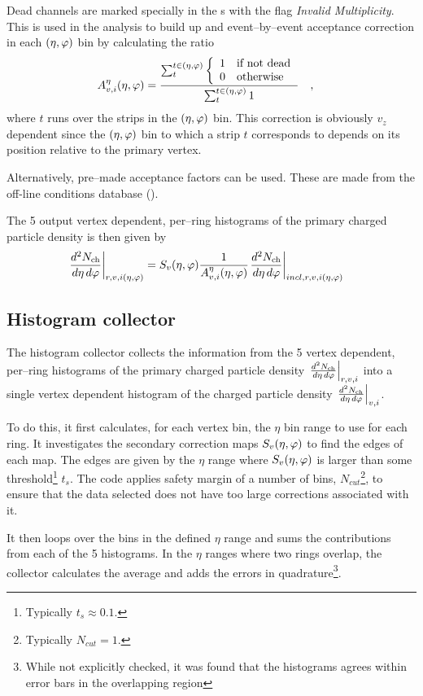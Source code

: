 \documentclass[11pt]{article}
\def\AlwaysText#1{\ifmmode\relax\text{#1}\else #1\fi}
\newcommand{\AbbrName}[1]{\AlwaysText{{\scshape #1}}}
\newcommand{\ESD}{\AbbrName{esd}}
\newcommand{\OCDB}{\AbbrName{ocdb}}
\newcommand{\mult}[1][]{\ensuremath N_{\text{ch}#1}}
\newcommand{\dndetadphi}[1][]{{\ensuremath%
    \ifx|#1|\else\left.\fi%
    \frac{d^2\mult{}}{d\eta\,d\varphi}%
    \ifx|#1|\else\right|_{#1}\fi%
}}
\newcommand{\etaphi}{\ensuremath(\eta,\varphi)}
\newcommand{\DeadCh}{\ensuremath A^{\eta}_{v,i}\etaphi}
\newcommand{\SecMap}{\ensuremath S_v\etaphi}
\begin{document}
Dead channels are marked specially in the \ESD{}s with the flag
\textit{Invalid Multiplicity}.  This is used in the analysis to build
up and event--by--event acceptance correction in each $\etaphi$
bin by calculating the ratio
\begin{align}
  \label{eq:dead_channels} 
  \DeadCh{} &= 
  \frac{\sum_t^{t\in\etaphi}\left\{\begin{array}{cl}
        1 & \text{if not dead}\\
        0 & \text{otherwise}
      \end{array}\right.}{\sum_t^{t\in\etaphi} 1}\quad,
\end{align}
where $t$ runs over the strips in the $\etaphi$ bin.  This correction
is obviously $v_z$ dependent since the $\etaphi$ bin to which a strip $t$
corresponds to depends on its  position relative to the primary vertex.

Alternatively, pre--made acceptance factors can be used.  These are
made from the off-line conditions database (\OCDB{}).

The 5 output vertex dependent, per--ring histograms of the primary
charged particle density is then given by
\begin{align}
  \dndetadphi[r,v,i\etaphi] &=
  \SecMap{} \frac{1}{\DeadCh{}}\dndetadphi[incl,r,v,i\etaphi]
\end{align}

\subsection{Histogram collector}
\label{sec:sub:hist_collector}

The histogram collector collects the information from the 5 vertex
dependent, per--ring histograms of the primary charged particle
density $\dndetadphi[r,v,i]$ into a single vertex dependent histogram
of the charged particle density $\dndetadphi[v,i]$.  

To do this, it first calculates, for each vertex bin, the $\eta$ bin
range to use for each ring.  It investigates the secondary correction
maps $\SecMap{}$ to find the edges of each map.  The edges are given
by the $\eta$ range where $\SecMap{}$ is larger than some
threshold\footnote{Typically $t_s\approx 0.1$.}  $t_s$. The code
applies safety margin of a number of bins, $N_{cut}$\footnote{Typically
  $N_{cut}=1$.}, to ensure that the data selected does not have too
large corrections associated with it.

It then loops over the bins in the defined $\eta$ range and sums the
contributions from each of the 5 histograms.  In the $\eta$ ranges
where two rings overlap, the collector calculates the average and adds
the errors in quadrature\footnote{While not explicitly checked, it was
  found that the histograms agrees within error bars in the
  overlapping region}.
\end{document}
